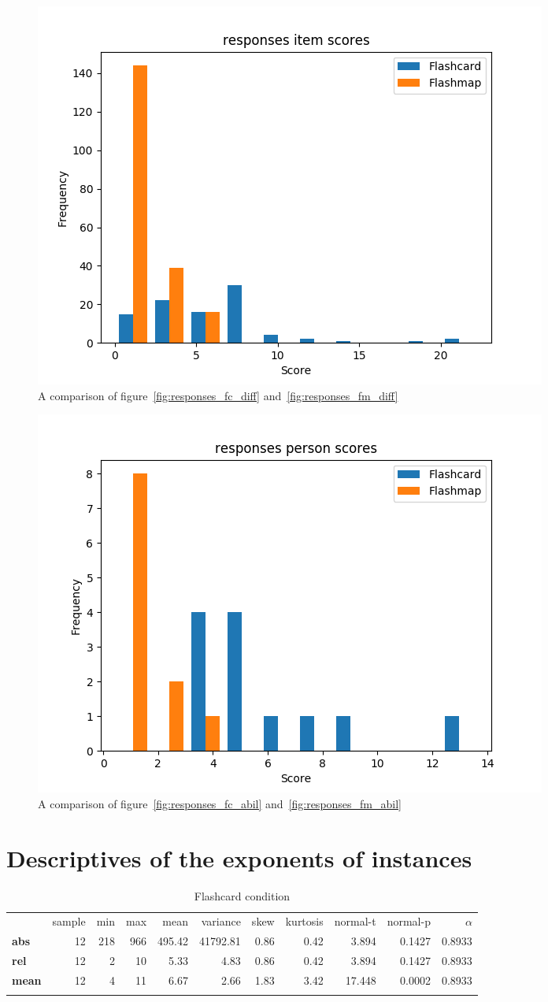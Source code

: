 \begin{figure}
    \centering
    \includegraphics[width=.7\textwidth]{img/responses_diff.png}
    \caption{A comparison of figure~\protect\ref{fig:responses_fc_diff} and~\protect\ref{fig:responses_fm_diff}}
    \label{fig:responses_diff}
\end{figure}
\begin{figure}
    \centering
    \includegraphics[width=.7\textwidth]{img/responses_abil.png}
    \caption{A comparison of figure~\protect\ref{fig:responses_fc_abil} and~\protect\ref{fig:responses_fm_abil}}
    \label{fig:responses_abil}
\end{figure}

\FloatBarrier
\section{Descriptives of the exponents of instances}

\begin{longtable}[c]{@{}lrrrrrrrrrr@{}}
    \caption{Flashcard condition}
    \endfirsthead
\toprule\addlinespace
& sample & min & max & mean & variance & skew & kurtosis & normal-t &
normal-p & $\alpha$
\\\addlinespace
\midrule
\textbf{abs} & 12 & 218 & 966 & 495.42 & 41792.81 & 0.86 & 0.42 & 3.894
& 0.1427 & 0.8933
\\\addlinespace
\textbf{rel} & 12 & 2 & 10 & 5.33 & 4.83 & 0.86 & 0.42 & 3.894 & 0.1427
& 0.8933
\\\addlinespace
\textbf{mean} & 12 & 4 & 11 & 6.67 & 2.66 & 1.83 & 3.42 & 17.448 &
0.0002 & 0.8933
\\\addlinespace
\bottomrule
    \label{tab:exponent_fc}
\end{longtable}

